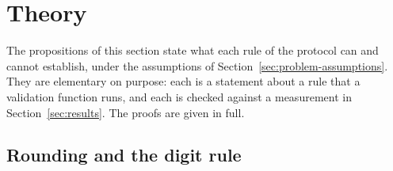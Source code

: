 \section{Theory}
\label{sec:theory}

The propositions of this section state what each rule of the protocol can and cannot establish, under the assumptions of Section~\ref{sec:problem-assumptions}. They are elementary on purpose: each is a statement about a rule that a validation function runs, and each is checked against a measurement in Section~\ref{sec:results}. The proofs are given in full.

\subsection{Rounding and the digit rule}
\label{sec:theory-rounding}

